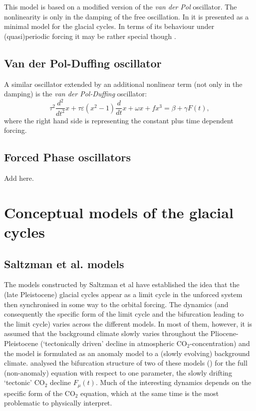 \documentclass[12pt]{article}
\def\be{\begin{equation}}
\def\ee{\end{equation}}
\begin{document}
This model is based on a modified version of the {\em van der Pol} oscillator. The nonlinearity is only in the damping of the free oscillation. In \cite{Crucifix2012a} it is presented as a minimal model for the glacial cycles. In terms of its behaviour under (quasi)periodic forcing it may be rather special though \cite{DeSaedeleer:2013dk}. 

\subsection{Van der Pol-Duffing oscillator}
A similar oscillator extended by an additional nonlinear term (not only in the damping) is the {\em van der Pol-Duffing} oscillator:
\be
\tau^2 \frac{d^2}{dt^2}x +\tau \varepsilon (x^2-1) \frac{d}{dt}x +\omega x + f x^3 = \beta + \gamma F(t),
\label{e:vdPD}
\ee 
where the right hand side is representing the constant plus time dependent forcing. 

\subsection{Forced Phase oscillators}

Add \cite{Mitsui:2015he} here. 


\section{Conceptual models of the glacial cycles}
\subsection{Saltzman et al. models}
The models constructed by Saltzman et al \cite{Saltzman:2002tl,Saltzman:1993iq,Saltzman:1991jl,Maasch:1990ul,Saltzman:1990uy,Saltzman:1988tv} have established the idea that the (late Pleistocene) glacial cycles appear as a limit cycle in the unforced system then synchronised in some way to the orbital forcing. The dynamics (and consequently the specific form of the limit cycle and the bifurcation leading to the limit cycle) varies across the different models. In most of them, however, it is assumed that the background climate slowly varies throughout the Pliocene-Pleistocene (`tectonically driven' decline in atmospheric CO$_2$-concentration) and the model is formulated as an anomaly model to a (slowly evolving) background climate.  \cite{Crucifix2012a} analysed the bifurcation structure of two of these models (\cite{Saltzman:1991jl,Saltzman:1990uy}) for the full (non-anomaly) equation with respect to one parameter, the slowly drifting `tectonic' CO$_2$ decline $F_\mu(t)$. Much of the interesting dynamics depends on the specific form of the CO$_2$ equation, which at the same time is the most problematic to physically interpret.
\end{document}
